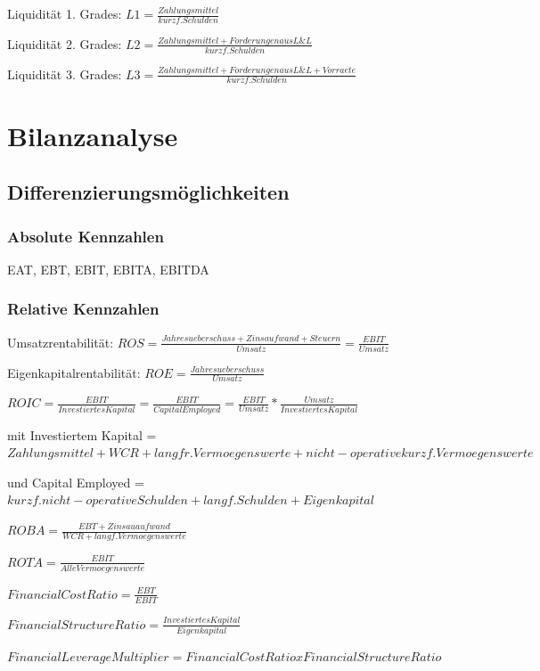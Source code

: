 \documentclass{article}
\begin{document}
Liquidität 1. Grades: $ L1 = \frac{Zahlungsmittel}{kurzf. Schulden}$

Liquidität 2. Grades: $ L2 = \frac{Zahlungsmittel + Forderungen aus L\&L}{kurzf. Schulden}$

Liquidität 3. Grades: $ L3 = \frac{Zahlungsmittel + Forderungen aus L\&L + Vorraete}{kurzf. Schulden}$

 



\section{Bilanzanalyse}
\subsection{Differenzierungsmöglichkeiten}
\subsubsection{Absolute Kennzahlen}

EAT, EBT, EBIT, EBITA, EBITDA

\subsubsection{Relative Kennzahlen}

Umsatzrentabilität:   $ ROS =  \frac{Jahresueberschuss + Zinsaufwand + Steuern}{Umsatz} = \frac{EBIT}{Umsatz} $ 

Eigenkapitalrentabilität:  $ ROE = \frac{Jahresueberschuss}{Umsatz} $

$ ROIC = \frac{EBIT}{Investiertes Kapital} = \frac{EBIT}{Capital Employed} = \frac{EBIT}{Umsatz}*\frac{Umsatz}{Investiertes Kapital} $

mit Investiertem Kapital = $ Zahlungsmittel + WCR + langfr. Vermoegenswerte + nicht-operative kurzf. Vermoegenswerte$

und Capital Employed = $ kurzf. nicht-operative Schulden + langf. Schulden + Eigenkapital $

$ ROBA = \frac{EBT+Zinsauaufwand}{WCR+langf. Vermoegenswerte} $

$ROTA = \frac{EBIT}{Alle Vermoegenswerte} $

$Financial Cost Ratio = \frac{EBT}{EBIT} $

$Financial Structure Ratio = \frac{Investiertes Kapital}{Eigenkapital} $

$Financial Leverage Multiplier = Financial Cost Ratio x Financial Structure Ratio$
\end{document}
